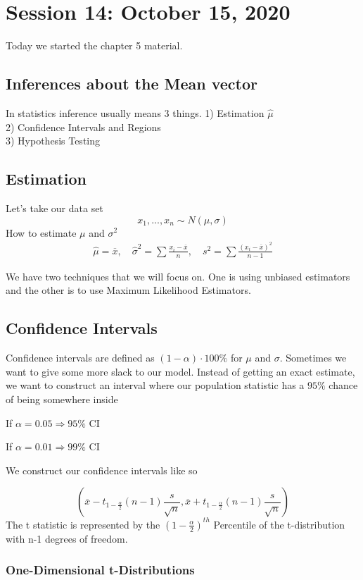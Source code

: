 \chapter{Session 14: October 15, 2020}
Today we started the chapter 5 material.
\section{Inferences about the Mean vector}
In statistics inference usually means 3 things.
1) Estimation $\hat \mu$ \\
2) Confidence Intervals and Regions\\
3) Hypothesis Testing\\

\section{Estimation}

Let's take our data set
\[x_1,...,x_n \sim N(\mu,\sigma)\]
How to estimate $\mu$ and $\sigma^2$
\begin{gather*}
  \hat\mu = \overline{x},\quad \hat\sigma^2
  = \sum \frac{x_i-\overline{x}}{n}, \quad s^2 = \sum \frac{(x_i-\overline{x})^2}{n-1}
\end{gather*}

We have two techniques that we will focus on. One is using unbiased estimators and the other is to use Maximum Likelihood Estimators.

\section{Confidence Intervals}
Confidence intervals are defined as $(1-\alpha)\cdot 100\%$ for $\mu$ and $\sigma$. Sometimes we want to give some more slack to our model. Instead of getting an exact estimate, we want to construct an interval where our population statistic has a $95\%$ chance of being somewhere inside

If  $\alpha = 0.05 \Rightarrow 95\%$ CI

If  $\alpha = 0.01 \Rightarrow 99\%$ CI

We construct our confidence intervals like so

\[(\overline{x} -t_{1-\frac{\alpha}{2}}(n-1)\frac{s}{\sqrt{n}}, \overline{x} +t_{1-\frac{\alpha}{2}}(n-1)\frac{s}{\sqrt{n}})\]
The t statistic is represented by the $(1-\frac{\alpha}{2})^{th}$ Percentile of the t-distribution with n-1 degrees of freedom.

\subsection{One-Dimensional t-Distributions}

